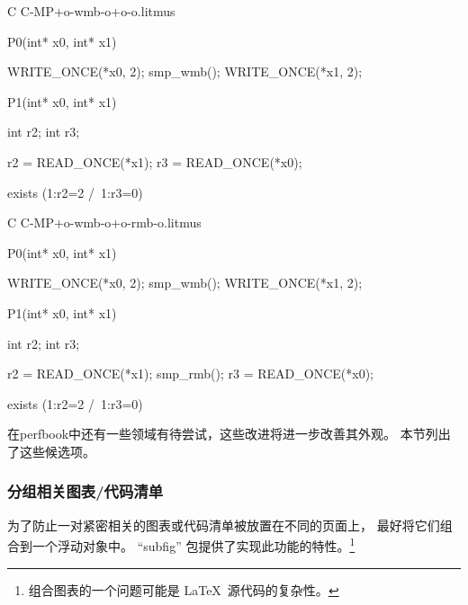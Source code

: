 \begin{listing*}%
\caption{消息传递石蕊测试（使用 subfig）}%
\label{lst:app:styleguide:Message-Passing Litmus Test (subfig)}%
{\scriptsize%
\begin{verbbox}[\LstLineNo]
C C-MP+o-wmb-o+o-o.litmus

{
}

P0(int* x0, int* x1) {

  WRITE_ONCE(*x0, 2);
  smp_wmb();
  WRITE_ONCE(*x1, 2);

}

P1(int* x0, int* x1) {

  int r2;
  int r3;

  r2 = READ_ONCE(*x1);
  r3 = READ_ONCE(*x0);

}


exists (1:r2=2 /\ 1:r3=0)
\end{verbbox}
}
\centering
\hspace*{\fill}
\subfloat[未强制排序]{
  \theverbbox
  \label{sublst:app:styleguide:Not Enforcing Order}
}
\hspace{\fill}
{\scriptsize%
\begin{verbbox}[\LstLineNo]
C C-MP+o-wmb-o+o-rmb-o.litmus

{
}

P0(int* x0, int* x1) {

  WRITE_ONCE(*x0, 2);
  smp_wmb();
  WRITE_ONCE(*x1, 2);

}

P1(int* x0, int* x1) {

  int r2;
  int r3;

  r2 = READ_ONCE(*x1);
  smp_rmb();
  r3 = READ_ONCE(*x0);

}

exists (1:r2=2 /\ 1:r3=0)
\end{verbbox}
}%
\subfloat[强制排序]{%
  \theverbbox
  \label{sublst:app:styleguide:Enforcing Order}
}\hspace*{\fill}%
\end{listing*}

在perfbook中还有一些领域有待尝试，这些改进将进一步改善其外观。
本节列出了这些候选项。

\subsubsection{分组相关图表/代码清单}
\label{sec:app:styleguide:Grouping Related Figures/Listings}

为了防止一对紧密相关的图表或代码清单被放置在不同的页面上，
最好将它们组合到一个浮动对象中。
``subfig'' 包提供了实现此功能的特性。\footnote{
  组合图表的一个问题可能是 \LaTeX\ 源代码的复杂性。}

